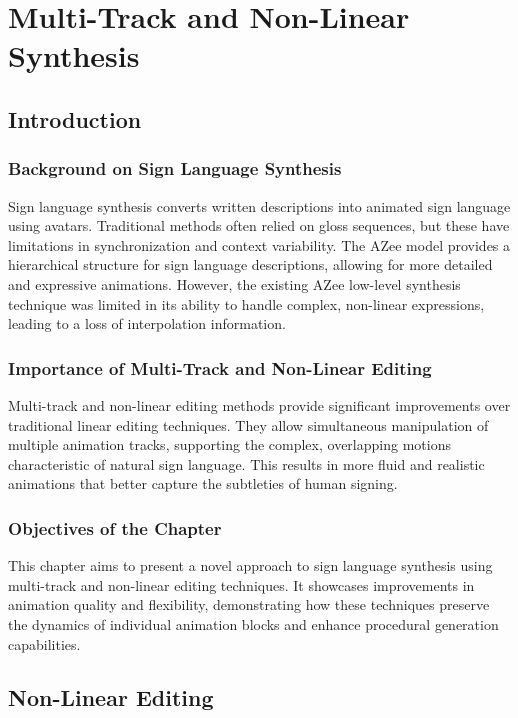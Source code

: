 \documentclass[../../main.tex]{subfiles}
\begin{document}
\chapter{Multi-Track and Non-Linear Synthesis}

\section{Introduction}

\subsection{Background on Sign Language Synthesis}
Sign language synthesis converts written descriptions into animated sign language using avatars. Traditional methods often relied on gloss sequences, but these have limitations in synchronization and context variability. The AZee model provides a hierarchical structure for sign language descriptions, allowing for more detailed and expressive animations. However, the existing AZee low-level synthesis technique was limited in its ability to handle complex, non-linear expressions, leading to a loss of interpolation information.

\subsection{Importance of Multi-Track and Non-Linear Editing}
Multi-track and non-linear editing methods provide significant improvements over traditional linear editing techniques. They allow simultaneous manipulation of multiple animation tracks, supporting the complex, overlapping motions characteristic of natural sign language. This results in more fluid and realistic animations that better capture the subtleties of human signing.

\subsection{Objectives of the Chapter}
This chapter aims to present a novel approach to sign language synthesis using multi-track and non-linear editing techniques. It showcases improvements in animation quality and flexibility, demonstrating how these techniques preserve the dynamics of individual animation blocks and enhance procedural generation capabilities.

\section{Non-Linear Editing}
\end{document}
